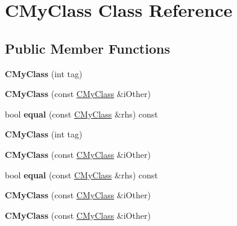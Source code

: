 \hypertarget{class_c_my_class}{}\section{C\+My\+Class Class Reference}
\label{class_c_my_class}
\subsection*{Public Member Functions}
\begin{DoxyCompactItemize}
\item 
\mbox{\label{class_c_my_class_ab1912cccaf57a26c6835075192e1bb18}} 
{\bfseries C\+My\+Class} (int tag)
\item 
\mbox{\label{class_c_my_class_afb05c852b59c0d651c6f5192e63bee49}} 
{\bfseries C\+My\+Class} (const \mbox{\hyperlink{class_c_my_class}{C\+My\+Class}} \&i\+Other)
\item 
\mbox{\label{class_c_my_class_ad7951d354b56c6cd248a44661578d50d}} 
bool {\bfseries equal} (const \mbox{\hyperlink{class_c_my_class}{C\+My\+Class}} \&rhs) const
\item 
\mbox{\label{class_c_my_class_ab1912cccaf57a26c6835075192e1bb18}} 
{\bfseries C\+My\+Class} (int tag)
\item 
\mbox{\label{class_c_my_class_afb05c852b59c0d651c6f5192e63bee49}} 
{\bfseries C\+My\+Class} (const \mbox{\hyperlink{class_c_my_class}{C\+My\+Class}} \&i\+Other)
\item 
\mbox{\label{class_c_my_class_ad7951d354b56c6cd248a44661578d50d}} 
bool {\bfseries equal} (const \mbox{\hyperlink{class_c_my_class}{C\+My\+Class}} \&rhs) const
\item 
\mbox{\label{class_c_my_class_afb05c852b59c0d651c6f5192e63bee49}} 
{\bfseries C\+My\+Class} (const \mbox{\hyperlink{class_c_my_class}{C\+My\+Class}} \&i\+Other)
\item 
\mbox{\label{class_c_my_class_afb05c852b59c0d651c6f5192e63bee49}} 
{\bfseries C\+My\+Class} (const \mbox{\hyperlink{class_c_my_class}{C\+My\+Class}} \&i\+Other)

\end{DoxyCompactItemize}
